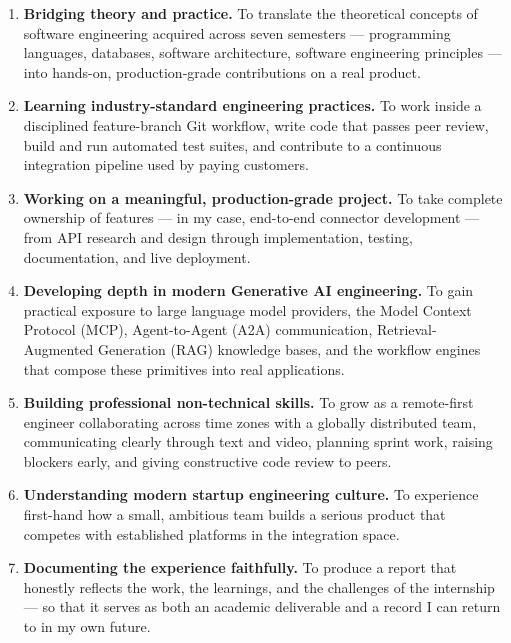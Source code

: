 \begin{enumerate}[leftmargin=*]
    \item \textbf{Bridging theory and practice.} To translate the
    theoretical concepts of software engineering acquired across seven
    semesters --- programming languages, databases, software
    architecture, software engineering principles --- into hands-on,
    production-grade contributions on a real product.

    \item \textbf{Learning industry-standard engineering practices.}
    To work inside a disciplined feature-branch Git workflow, write
    code that passes peer review, build and run automated test suites,
    and contribute to a continuous integration pipeline used by paying
    customers.

    \item \textbf{Working on a meaningful, production-grade project.}
    To take complete ownership of features --- in my case, end-to-end
    connector development --- from API research and design through
    implementation, testing, documentation, and live deployment.

    \item \textbf{Developing depth in modern Generative AI engineering.}
    To gain practical exposure to large language model providers, the
    Model Context Protocol (MCP), Agent-to-Agent (A2A) communication,
    Retrieval-Augmented Generation (RAG) knowledge bases, and the
    workflow engines that compose these primitives into real
    applications.

    \item \textbf{Building professional non-technical skills.} To grow
    as a remote-first engineer collaborating across time zones with a
    globally distributed team, communicating clearly through text and
    video, planning sprint work, raising blockers early, and giving
    constructive code review to peers.

    \item \textbf{Understanding modern startup engineering culture.}
    To experience first-hand how a small, ambitious team builds a
    serious product that competes with established platforms in the
    integration space.

    \item \textbf{Documenting the experience faithfully.} To produce a
    report that honestly reflects the work, the learnings, and the
    challenges of the internship --- so that it serves as both an
    academic deliverable and a record I can return to in my own future.
\end{enumerate}

